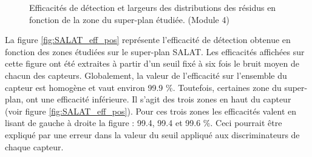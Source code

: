      \begin{figure}[htb!]
     \begin{center}
     \end{center}
     \caption{Efficacit\'es de d\'etection et largeurs des distributions des r\'esidus en fonction de la zone du super-plan \'etudi\'ee. (Module 4)}
     \label{fig:zonesSALAT}
     \end{figure}
   
  
  \medskip

  La figure \ref{fig:SALAT_eff_pos} repr\'esente l'efficacit\'e de d\'etection obtenue en fonction des zones \'etudi\'ees sur le super-plan SALAT. Les efficacit\'es affich\'ees sur cette figure ont \'et\'e extraites \`a partir d'un seuil fix\'e \`a six fois le bruit moyen de chacun des capteurs. Globalement, la valeur de l'efficacit\'e sur l'ensemble du capteur est homog\`ene et vaut environ 99.9 $\%$. Toutefois, certaines zone du super-plan, ont une efficacit\'e inf\'erieure. Il s'agit des trois zones en haut du capteur (voir figure \ref{fig:SALAT_eff_pos}). Pour ces trois zones les efficacit\'es valent en lisant de gauche \`a droite la figure : 99.4, 99.4 et 99.6 $\%$. Ceci pourrait \^etre expliqu\'e par une erreur dans la valeur du seuil appliqu\'e aux discriminateurs de chaque capteur.
   
